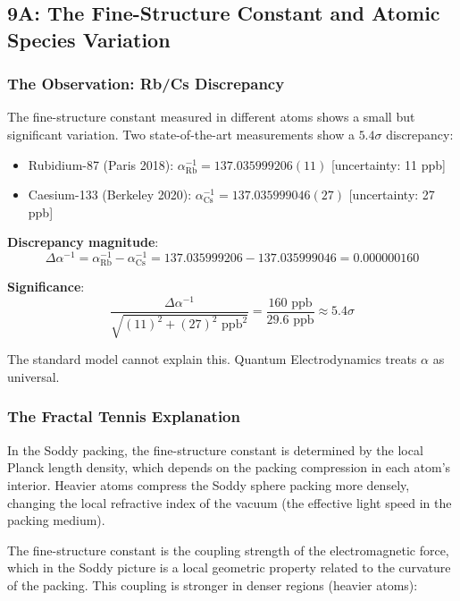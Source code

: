 \documentclass[11pt,a4paper]{article}
\begin{document}
\subsection{9A: The Fine-Structure Constant and Atomic Species Variation}

\subsubsection{The Observation: Rb/Cs Discrepancy}

The fine-structure constant measured in different atoms shows a small but significant variation. Two state-of-the-art measurements show a $5.4\sigma$ discrepancy:

\begin{itemize}
\item Rubidium-87 (Paris 2018): $\alpha^{-1}_\mathrm{Rb} = 137.035999206(11)$ [uncertainty: 11 ppb]
\item Caesium-133 (Berkeley 2020): $\alpha^{-1}_\mathrm{Cs} = 137.035999046(27)$ [uncertainty: 27 ppb]
\end{itemize}

\noindent\textbf{Discrepancy magnitude}:
\[
\Delta\alpha^{-1} = \alpha^{-1}_\mathrm{Rb} - \alpha^{-1}_\mathrm{Cs} = 137.035999206 - 137.035999046 = 0.000000160
\]

\noindent\textbf{Significance}:
\[
\frac{\Delta\alpha^{-1}}{\sqrt{(11)^2 + (27)^2 \text{ ppb}^2}} = \frac{160 \text{ ppb}}{29.6 \text{ ppb}} \approx 5.4\sigma
\]

The standard model cannot explain this. Quantum Electrodynamics treats $\alpha$ as universal.

\subsubsection{The Fractal Tennis Explanation}

In the Soddy packing, the fine-structure constant is determined by the local Planck length density, which depends on the packing compression in each atom's interior. Heavier atoms compress the Soddy sphere packing more densely, changing the local refractive index of the vacuum (the effective light speed in the packing medium).

The fine-structure constant is the coupling strength of the electromagnetic force, which in the Soddy picture is a local geometric property related to the curvature of the packing. This coupling is stronger in denser regions (heavier atoms):
\end{document}
